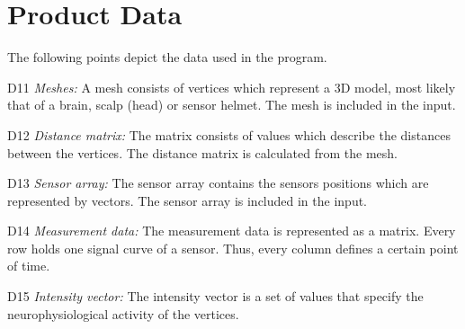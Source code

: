\section{Product Data}
The following points depict the data used in the program.
	\begin{aims}
		\item[D11] \textit{Meshes:} A mesh consists of vertices which represent a 3D model, most likely that of a brain, scalp (head) or sensor helmet. The mesh is included in the input.
		
		\item[D12] \textit{Distance matrix:} The matrix consists of values which describe the distances between the vertices. The distance matrix is calculated from the mesh.
		
		\item[D13] \textit{Sensor array:} The sensor array contains the sensors positions which are represented by vectors. The sensor array is included in the input.
		
		\item[D14] \textit{Measurement data:} The measurement data is represented as a matrix. Every row holds one signal curve of a sensor. Thus, every column defines a certain point of time.
		
		\item[D15] \textit{Intensity vector:} The intensity vector is a set of values that specify the neurophysiological activity of the vertices.
	\end{aims}